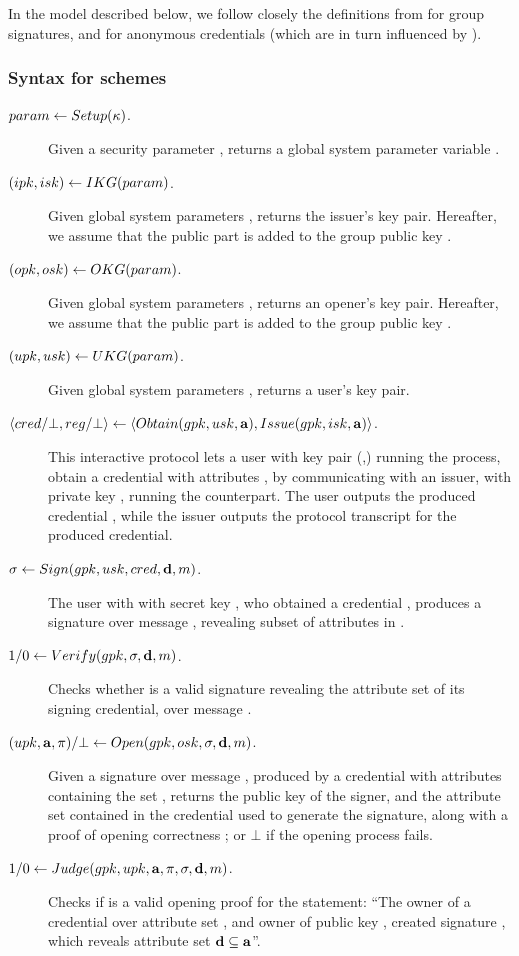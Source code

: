 In the model described below, we follow closely the definitions from
\cite{bsz05} for group signatures, and \cite{fhs19} for anonymous credentials
(which are in turn influenced by \cite{bsz05}).

\subsubsection{Syntax for \GSAC schemes}
\label{sssec:syntax-gsac}

\begin{description}
\item[$param \gets Setup(\kappa)$.] Given a security parameter \secpar,
  returns a global system parameter variable \parm.
\item[$(ipk,isk) \gets IKG(param)$.] Given global system parameters
  \parm, returns the issuer's key pair. Hereafter, we assume that the public
  part \ipk is added to the group public key \gpk.
\item[$(opk,osk) \gets OKG(param)$.] Given global system parameters
  \parm, returns an opener's key pair. Hereafter, we assume that the public part
  \opk is added to the group public key \gpk.
\item[$(upk,usk) \gets UKG(param)$.] Given global system parameters
  \parm, returns a user's key pair.
\item[$\langle cred/\bot,reg/\bot \rangle \gets
  \langle Obtain(gpk,usk,\mathbf{a}),Issue(gpk,isk,\mathbf{a}) \rangle$.]
  This interactive protocol lets a user with key pair (\upk,\usk) running the
  \Obtain process, obtain a credential \cred with attributes \attrs, by
  communicating with an issuer, with private key \isk, running the \Issue
  counterpart. The user outputs the produced credential \cred, while the issuer
  outputs the protocol transcript \utrans for the produced credential.
\item[$\sigma \gets Sign(gpk,usk,cred,\mathbf{d},m)$.] The user with
  with secret key \usk, who obtained a credential \cred, produces a signature
  \sig over message \msg, revealing subset of attributes \dattrs in \cred.
\item[$1/0 \gets Verify(gpk,\sigma,\mathbf{d},m)$.] Checks whether \sig is a
  valid signature revealing the attribute set \dattrs of its signing credential,
  over message \msg.
\item[$(upk,\mathbf{a},\pi)/\bot \gets
  Open(gpk,osk,\sigma,\mathbf{d},m)$.]
  Given a signature \sig over message \msg, produced by a credential with
  attributes containing the set \dattrs, returns the public key \upk of the
  signer, and the attribute set \attr contained in the credential used to
  generate the signature, along with a proof of opening correctness \oproof; or
  $\bot$ if the opening process fails.
\item[$1/0 \gets Judge(gpk,upk,\mathbf{a},\pi,\sigma,\mathbf{d},
  m)$.] Checks if \oproof is a valid opening proof for the
  statement: ``The owner of a credential over attribute set \attrs, and owner
  of public key \upk, created signature \sig, which reveals attribute set
  $\mathbf{d} \subseteq \mathbf{a}$''.
\end{description}

